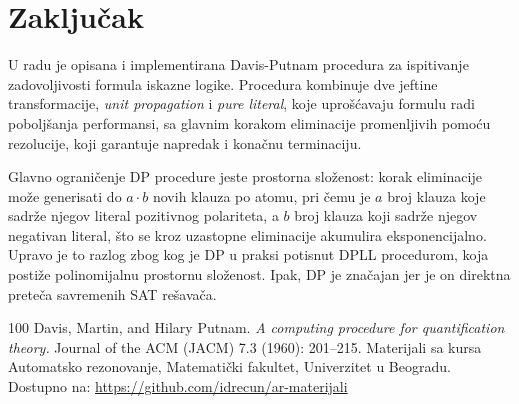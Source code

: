 \documentclass[a4paper,10pt]{article}
\begin{document}
\section{Zaključak}
\label{sec:zakljucak}
U radu je opisana i implementirana Davis-Putnam procedura za ispitivanje zadovoljivosti formula iskazne logike. Procedura kombinuje dve jeftine transformacije, \emph{unit propagation} i \emph{pure literal}, koje uprošćavaju formulu radi poboljšanja performansi, sa glavnim korakom eliminacije promenljivih pomoću rezolucije, koji garantuje napredak i konačnu terminaciju.

Glavno ograničenje DP procedure jeste prostorna složenost: korak eliminacije može generisati do $a \cdot b$ novih klauza po atomu, pri čemu je $a$ broj klauza koje sadrže njegov literal pozitivnog polariteta, a $b$ broj klauza koji sadrže njegov negativan literal, što se kroz uzastopne eliminacije akumulira eksponencijalno. Upravo je to razlog zbog kog je DP u praksi potisnut DPLL procedurom, koja postiže polinomijalnu prostornu složenost. Ipak, DP je značajan jer je on direktna preteča savremenih SAT rešavača.



\begin{thebibliography}{100}
  Davis, Martin, and Hilary Putnam. \emph{A computing procedure for quantification theory.} Journal of the ACM (JACM) 7.3 (1960): 201--215.
 Materijali sa kursa Automatsko rezonovanje, Matematički fakultet, Univerzitet u Beogradu. Dostupno na: \url{https://github.com/idrecun/ar-materijali}
\end{thebibliography}
\end{document}
